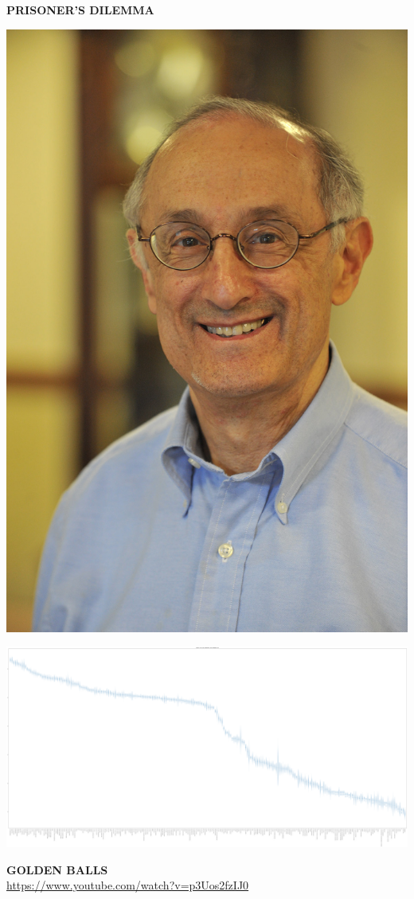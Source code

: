 \documentclass{beamer}
\begin{document}
\begin{frame}
    \centering
    \huge {\textbf{PRISONER'S DILEMMA}}
\end{frame}

\begin{frame}
    \centering
    
\end{frame}

\begin{frame}
    \centering
    \includegraphics[width=.4\textwidth]{Axelrod}
\end{frame}

\begin{frame}
    \centering
    \includegraphics[width=\textwidth]{strategies}
\end{frame}

\begin{frame}
    \centering
    \huge {\textbf{GOLDEN BALLS}} \\
    \large{\url{https://www.youtube.com/watch?v=p3Uos2fzIJ0}}
\end{frame}
\end{document}

